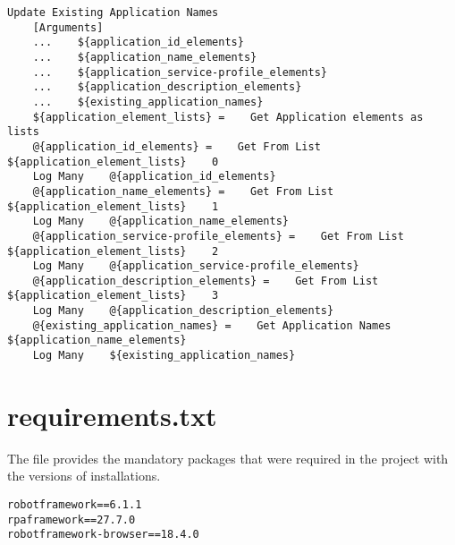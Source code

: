\begin{verbatim}
Update Existing Application Names
    [Arguments]
    ...    ${application_id_elements}
    ...    ${application_name_elements}
    ...    ${application_service-profile_elements}
    ...    ${application_description_elements}
    ...    ${existing_application_names}
    ${application_element_lists} =    Get Application elements as lists
    @{application_id_elements} =    Get From List    ${application_element_lists}    0
    Log Many    @{application_id_elements}
    @{application_name_elements} =    Get From List    ${application_element_lists}    1
    Log Many    @{application_name_elements}
    @{application_service-profile_elements} =    Get From List    ${application_element_lists}    2
    Log Many    @{application_service-profile_elements}
    @{application_description_elements} =    Get From List    ${application_element_lists}    3
    Log Many    @{application_description_elements}
    @{existing_application_names} =    Get Application Names    ${application_name_elements}
    Log Many    ${existing_application_names}

\end{verbatim}

\section{requirements.txt}

The  file provides the mandatory packages that were required in the project with the versions of installations.

\begin{verbatim}
robotframework==6.1.1
rpaframework==27.7.0
robotframework-browser==18.4.0

\end{verbatim}

\clearpage


